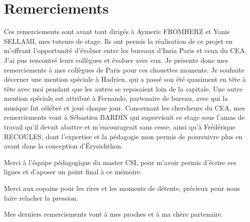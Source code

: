 \section*{Remerciements}


Ces remerciements sont avant tout dirigés à Aymeric FROMHERZ et Yanis SELLAMI, mes tuteurs de stage. Ils ont permis la réalisation de ce projet en m'offrant l'opportunité d'évoluer entre les bureaux d'Inria Paris et ceux du CEA. J'ai pus rencontré leurs collègues et évoluer avec eux. Je présente donc mes remerciements à mes collègues de Paris pour ces chouettes moments. Je souhaite décerner une mention spéciale à Hadrien, qui a passé son été quasiment en tête à tête avec moi pendant que les autres se reposaient loin de la capitale. Une autre mention spéciale est attribué à Fernando, partenaire de bureau, avec qui la musique fut célébré et joué chaque jour. Concernant les chercheurs du CEA, mes remerciements vont à Sébastien BARDIN qui supervisait ce stage sous l'amas de travail qu'il devait abattre et m'encourageait sans cesse, ainsi qu'à Frédérique RECOULES, dont l'expertise et la pédagogie mon permis de poursuivre plus en avant dans la conception d'Érysichthon.\smallbreak

Merci à l'équipe pédagogique du master CSI, pour m'avoir permis d'écrire ces lignes et d'aposer un point final à ce mémoire.\smallbreak

Merci aux copains pour les rires et les moments de détente, précieux pour nous faire relacher la pression.\smallbreak

Mes derniers remerciements vont à mes proches et à ma chère partenaire.

